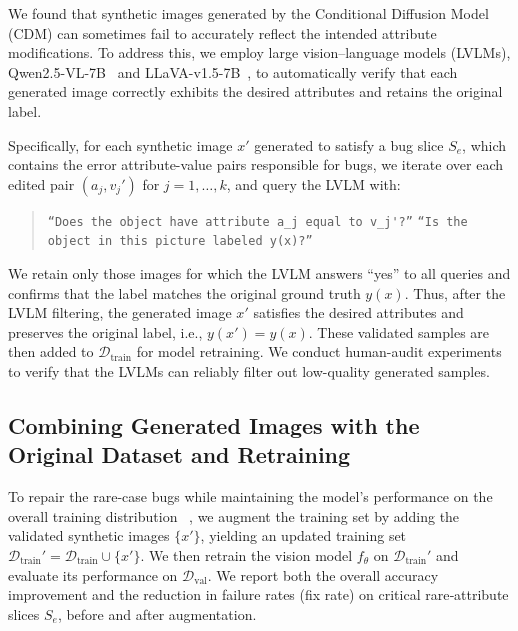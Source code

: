 \documentclass[10pt]{article} %
\newcommand{\qwen}{Qwen2.5-VL\xspace}
\newcommand{\llava}{LLaVA-v1.5\xspace}
\begin{document}
We found that synthetic images generated by the Conditional Diffusion Model (CDM) can sometimes fail to accurately reflect the intended attribute modifications. To address this, we employ large vision--language models (LVLMs), \qwen{}-7B~\citep{bai2025qwen25vl} and \llava{}-7B~\citep{liu2023improvedllava}, to automatically verify that each generated image correctly exhibits the desired attributes and retains the original label.

Specifically, for each synthetic image \(x'\) generated to satisfy a bug slice \(S_e\), which contains the error attribute-value pairs responsible for bugs, we iterate over each edited pair \((a_j, v_j')\) for \(j = 1, \dots, k\), and query the LVLM with: 
\vspace{-3pt}
\begin{quote}
\centering
\setlength{\parskip}{0pt}
\setlength{\parsep}{0pt}
\texttt{``Does the object have attribute \(a_j\) equal to \(v_j'\)?''} \newline
\texttt{``Is the object in this picture labeled \(y(x)\)?''}
\end{quote}
\vspace{-5pt}

We retain only those images for which the LVLM answers “yes” to all queries and confirms that the label matches the original ground truth \(y(x)\). Thus, after the LVLM filtering, the generated image \(x'\) satisfies the desired attributes and preserves the original label, i.e., \(y(x') = y(x)\). These validated samples are then added to \(\mathcal{D}_{\mathrm{train}}\) for model retraining. We conduct human-audit experiments to verify that the LVLMs can reliably filter out low-quality generated samples.



\subsection{Combining Generated Images with the Original Dataset and Retraining}
To repair the rare-case bugs while maintaining the model's performance on the overall training distribution ~\citep{lee2024genmix}, we augment the training set by adding the validated synthetic images \(\{x'\}\), yielding an updated training set 
$
\mathcal{D}_{\mathrm{train}}' = \mathcal{D}_{\mathrm{train}} \cup \{x'\}.
$
We then retrain the vision model \(f_\theta\) on \(\mathcal{D}_{\mathrm{train}}'\) and evaluate its performance on \(\mathcal{D}_{\mathrm{val}}\). We report both the overall accuracy improvement and the reduction in failure rates (fix rate) on critical rare‐attribute slices \(S_e\), before and after augmentation.
\end{document}
